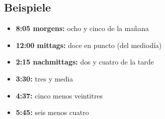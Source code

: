 \documentclass{spanish_summary}
\begin{document}
\subsection*{Beispiele}
\begin{itemize}
  \item \textbf{8:05 morgens:} ocho y cinco de la ma\~{n}ana 
  \item \textbf{12:00 mittags:} doce en puncto (del mediodía)
  \item \textbf{2:15 nachmittags:} dos y cuatro de la tarde
  \item \textbf{3:30:} tres y media
  \item \textbf{4:37:} cinco menos veintitres
  \item \textbf{5:45:} seis menos cuatro
\end{itemize}
\end{document}
